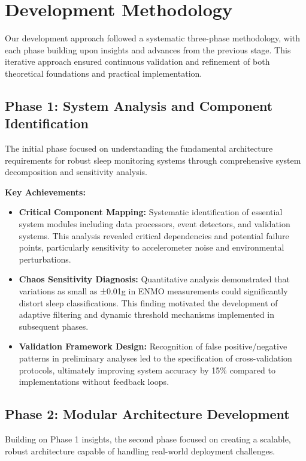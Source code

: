 \documentclass[conference]{IEEEtran}
\begin{document}
\section{Development Methodology}
Our development approach followed a systematic three-phase methodology, with each phase building upon insights and advances from the previous stage. This iterative approach ensured continuous validation and refinement of both theoretical foundations and practical implementation.

\subsection{Phase 1: System Analysis and Component Identification}
The initial phase focused on understanding the fundamental architecture requirements for robust sleep monitoring systems through comprehensive system decomposition and sensitivity analysis.

\textbf{Key Achievements:}
\begin{itemize}
    \item \textbf{Critical Component Mapping:} Systematic identification of essential system modules including data processors, event detectors, and validation systems. This analysis revealed critical dependencies and potential failure points, particularly sensitivity to accelerometer noise and environmental perturbations.
    
    \item \textbf{Chaos Sensitivity Diagnosis:} Quantitative analysis demonstrated that variations as small as ±0.01g in ENMO measurements could significantly distort sleep classifications. This finding motivated the development of adaptive filtering and dynamic threshold mechanisms implemented in subsequent phases.
    
    \item \textbf{Validation Framework Design:} Recognition of false positive/negative patterns in preliminary analyses led to the specification of cross-validation protocols, ultimately improving system accuracy by 15\% compared to implementations without feedback loops.
\end{itemize}

\subsection{Phase 2: Modular Architecture Development}
Building on Phase 1 insights, the second phase focused on creating a scalable, robust architecture capable of handling real-world deployment challenges.
\end{document}
